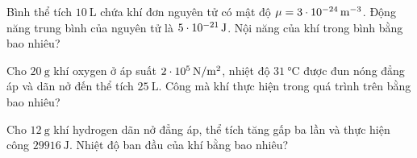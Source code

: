 \begin{ex}
	Bình thể tích $\SI{10}{\liter}$ chứa khí đơn nguyên tử có mật độ $\mu=\SI{3E-24}{\meter^{-3}}$. Động năng trung bình của nguyên tử là $\SI{5E-21}{\joule}$. Nội năng của khí trong bình bằng bao nhiêu?
	
\end{ex}
\begin{ex}
	Cho $\SI{20}{\gram}$ khí oxygen ở áp suất $\SI{2E5}{\newton/\meter^2}$, nhiệt độ $\SI{31}{\celsius}$ được đun nóng đẳng áp và dãn nở đến thể tích $\SI{25}{\liter}$. Công mà khí thực hiện trong quá trình trên bằng bao nhiêu?
\end{ex}
\begin{ex}
	Cho $\SI{12}{\gram}$ khí hydrogen dãn nở đẳng áp, thể tích tăng gấp ba lần và thực hiện công $\SI{29916}{\joule}$. Nhiệt độ ban đầu của khí bằng bao nhiêu?
	
\end{ex}

